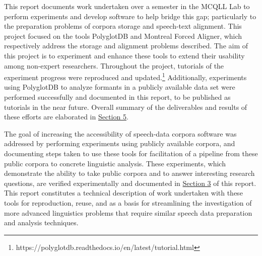 \documentclass[11pt]{article}
\begin{document}
This report documents work undertaken over a semester in the MCQLL Lab to perform experiments and develop software to help bridge this gap; particularly to the preparation problems of corpora storage and speech-text alignment. This project focused on the tools PolyglotDB\cite{mcauliffe_polyglot_2017} and Montreal Forced Aligner\cite{mcauliffe_montreal_nodate}, which respectively address the storage and alignment problems described. The aim of this project is to experiment and enhance these tools to extend their usability among non-expert researchers. Throughout the project, tutorials of the experiment progress were reproduced and updated.\footnote{https://polyglotdb.readthedocs.io/en/latest/tutorial.html} Additionally, experiments using PolyglotDB to analyze formants in a publicly available data set were performed successfully and documented in this report, to be published as tutorials in the near future. Overall summary of the deliverables and results of these efforts are elaborated in \hyperlink{section.5}{Section 5}.

The goal of increasing the accessibility of speech-data corpora software was addressed by performing experiments using publicly available corpora, and documenting steps taken to use these tools for facilitation of a pipeline from these public corpora to concrete linguistic analysis. These experiments, which demonstrate the ability to take public corpora and to answer interesting research questions, are verified experimentally and documented in \hyperlink{section.3}{Section 3} of this report. This report constitutes a technical description of work undertaken with these tools for reproduction, reuse, and as a basis for streamlining the investigation of more advanced linguistics problems that require similar speech data preparation and analysis techniques.
\end{document}
